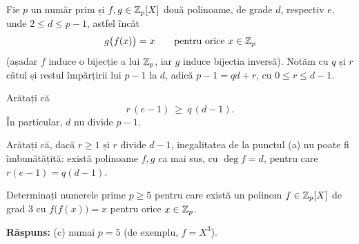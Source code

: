 \begin{problema}
Fie $p$ un număr prim și $f,g\in\mathbb{Z}_p[X]$ două polinoame, de grade $d$, respectiv $e$, unde $2\le d\le p-1$, astfel încât
\[
  g\bigl(f(x)\bigr)=x\qquad\text{pentru orice } x\in\mathbb{Z}_p
\]
(așadar $f$ induce o bijecție a lui $\mathbb{Z}_p$, iar $g$ induce bijecția inversă). Notăm cu $q$ și $r$ câtul și restul împărțirii lui $p-1$ la $d$, adică $p-1=qd+r$, cu $0\le r\le d-1$.
\begin{parti}
\item Arătați că
\[
  r\,(e-1)\ \ge\ q\,(d-1).
\]
În particular, $d$ nu divide $p-1$.
\item Arătați că, dacă $r\ge 1$ și $r$ divide $d-1$, inegalitatea de la punctul (a) nu poate fi îmbunătățită: există polinoame $f,g$ ca mai sus, cu $\deg f=d$, pentru care $r(e-1)=q(d-1)$.
\item Determinați numerele prime $p\ge 5$ pentru care există un polinom $f\in\mathbb{Z}_p[X]$ de grad $3$ cu $f\bigl(f(x)\bigr)=x$ pentru orice $x\in\mathbb{Z}_p$.
\end{parti}
\end{problema}

\noindent\textbf{Răspuns:} (c) numai $p=5$ (de exemplu, $f=X^{3}$).

